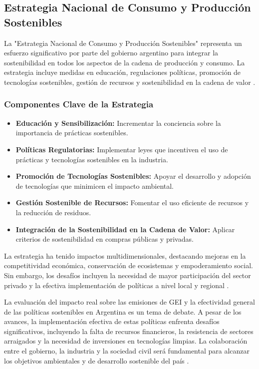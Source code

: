 \documentclass[main.tex]{subfiles}
\begin{document}
\subsection{Estrategia Nacional de Consumo y Producción Sostenibles}

La "Estrategia Nacional de Consumo y Producción Sostenibles" representa un esfuerzo significativo por parte del gobierno argentino para integrar la sostenibilidad en todos los aspectos de la cadena de producción y consumo. La estrategia incluye medidas en educación, regulaciones políticas, promoción de tecnologías sostenibles, gestión de recursos y sostenibilidad en la cadena de valor \cite{sostenible2021argentina}.

\subsubsection{Componentes Clave de la Estrategia}

\begin{itemize}
    \item \textbf{Educación y Sensibilización:} Incrementar la conciencia sobre la importancia de prácticas sostenibles.
    \item \textbf{Políticas Regulatorias:} Implementar leyes que incentiven el uso de prácticas y tecnologías sostenibles en la industria.
    \item \textbf{Promoción de Tecnologías Sostenibles:} Apoyar el desarrollo y adopción de tecnologías que minimicen el impacto ambiental.
    \item \textbf{Gestión Sostenible de Recursos:} Fomentar el uso eficiente de recursos y la reducción de residuos.
    \item \textbf{Integración de la Sostenibilidad en la Cadena de Valor:} Aplicar criterios de sostenibilidad en compras públicas y privadas.
\end{itemize}

La estrategia ha tenido impactos multidimensionales, destacando mejoras en la competitividad económica, conservación de ecosistemas y empoderamiento social. Sin embargo, los desafíos incluyen la necesidad de mayor participación del sector privado y la efectiva implementación de políticas a nivel local y regional \cite{sostenible2021argentina}.

La evaluación del impacto real sobre las emisiones de GEI y la efectividad general de las políticas sostenibles en Argentina es un tema de debate. A pesar de los avances, la implementación efectiva de estas políticas enfrenta desafíos significativos, incluyendo la falta de recursos financieros, la resistencia de sectores arraigados y la necesidad de inversiones en tecnologías limpias. La colaboración entre el gobierno, la industria y la sociedad civil será fundamental para alcanzar los objetivos ambientales y de desarrollo sostenible del país \cite{dormido2021fundar, sostenible2021argentina}.
\end{document}
